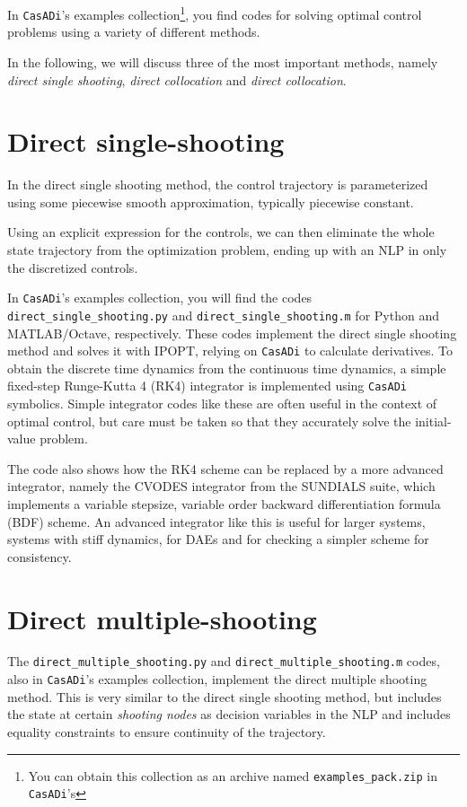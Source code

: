 \documentclass[a4paper,12pt]{book}
\newcommand{\CasADi}{\texttt{CasADi}\xspace}
\begin{document}
In \CasADi's examples collection\footnote{You can obtain this collection as an archive named \texttt{examples\_pack.zip} in \CasADi's }, you find codes for solving optimal control problems using a variety of different methods.

In the following, we will discuss three of the most important methods, namely
\emph{direct single shooting}, \emph{direct collocation} and \emph{direct collocation}.

\section{Direct single-shooting}

In the direct single shooting method, the control trajectory is parameterized
using some piecewise smooth approximation, typically piecewise constant.

Using an explicit expression for the controls, we can then eliminate the whole
state trajectory from the optimization problem, ending up with an NLP in only
the discretized controls.

In \CasADi's examples collection, you will find the codes
\verb|direct_single_shooting.py| and \verb|direct_single_shooting.m|
for Python and MATLAB/Octave, respectively. These codes implement the direct single
shooting method and solves it with IPOPT, relying on \CasADi to calculate derivatives.
To obtain the discrete time dynamics from the continuous time dynamics, a
simple fixed-step Runge-Kutta 4 (RK4) integrator is implemented using \CasADi symbolics.
Simple integrator codes like these are often useful in the context of optimal control,
but care must be taken so that they accurately solve the initial-value
problem.

The code also shows how the RK4 scheme can be replaced by a
more advanced integrator, namely the CVODES integrator from the SUNDIALS suite,
which implements a variable stepsize, variable order backward differentiation formula
(BDF) scheme. An advanced integrator like this is useful for larger systems,
systems with stiff dynamics, for DAEs and for checking a simpler scheme for
consistency.

\section{Direct multiple-shooting}
The \verb|direct_multiple_shooting.py| and \verb|direct_multiple_shooting.m|
codes, also in \CasADi's examples collection, implement the direct multiple
shooting method. This is very similar to the direct single shooting method,
but includes the state at certain \emph{shooting nodes} as decision variables in
the NLP and includes equality constraints to ensure continuity of the trajectory.
\end{document}
